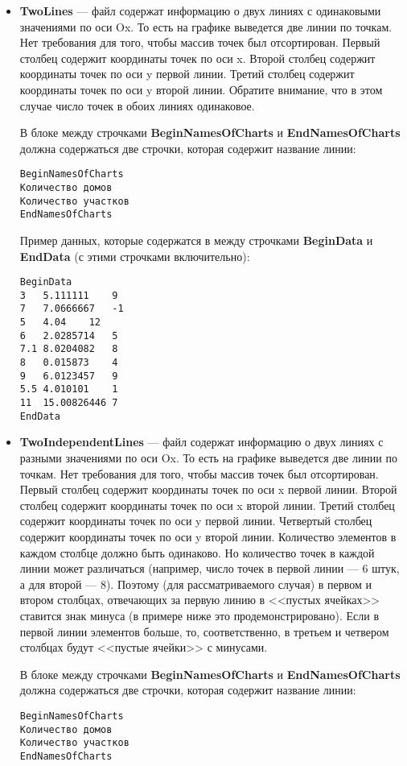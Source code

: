 \documentclass[a4paper,12pt]{article}
\begin{document}
\begin{itemize}
\begin{itemize}
\item \textbf{TwoLines} --- файл содержат информацию о двух линиях с одинаковыми значениями по оси Ox. То есть на графике выведется две линии по точкам. Нет требования для того, чтобы массив точек был отсортирован. Первый столбец содержит координаты точек по оси x. Второй столбец содержит координаты точек по оси y первой линии. Третий столбец содержит координаты точек по оси y второй линии. Обратите внимание, что в этом случае число точек в обоих линиях одинаковое.

В блоке между строчками \textbf{BeginNamesOfCharts} и \textbf{EndNamesOfCharts} должна содержаться две строчки, которая содержит название линии:
\begin{lstlisting}[label=Line03_4,caption=Для TwoLines ]
BeginNamesOfCharts
Количество домов
Количество участков
EndNamesOfCharts
\end{lstlisting}

Пример данных, которые содержатся в между строчками \textbf{BeginData} и \textbf{EndData} (с этими строчками включительно):
\begin{lstlisting}[label=Line03_5,caption=Для TwoLines ]
BeginData
3	5.111111	9
7	7.0666667	-1
5	4.04	12
6	2.0285714	5
7.1	8.0204082	8
8	0.015873	4
9	6.0123457	9
5.5	4.010101	1
11	15.00826446	7
EndData
\end{lstlisting}

\item \textbf{TwoIndependentLines} --- файл содержат информацию о двух линиях с разными значениями по оси Ox. То есть на графике выведется две линии по точкам. Нет требования для того, чтобы массив точек был отсортирован. Первый столбец содержит координаты точек по оси x первой линии. Второй столбец содержит координаты точек по оси x второй линии. Третий столбец содержит координаты точек по оси y первой линии. Четвертый столбец содержит координаты точек по оси y второй линии. Количество элементов в каждом столбце должно быть одинаково. Но количество точек в каждой линии может различаться (например, число точек в первой линии --- 6 штук, а для второй --- 8). Поэтому (для рассматриваемого случая) в первом и втором столбцах, отвечающих за первую линию в <<пустых ячейках>> ставится знак минуса (в примере ниже это продемонстрировано). Если в первой линии элементов больше, то, соответственно, в третьем и четвером столбцах будут  <<пустые ячейки>> с минусами.

В блоке между строчками \textbf{BeginNamesOfCharts} и \textbf{EndNamesOfCharts} должна содержаться две строчки, которая содержит название линии:
\begin{lstlisting}[label=Line03_6,caption=Для TwoIndependentLines ]
BeginNamesOfCharts
Количество домов
Количество участков
EndNamesOfCharts
\end{lstlisting}


\end{itemize}
\end{itemize}
\end{document}
